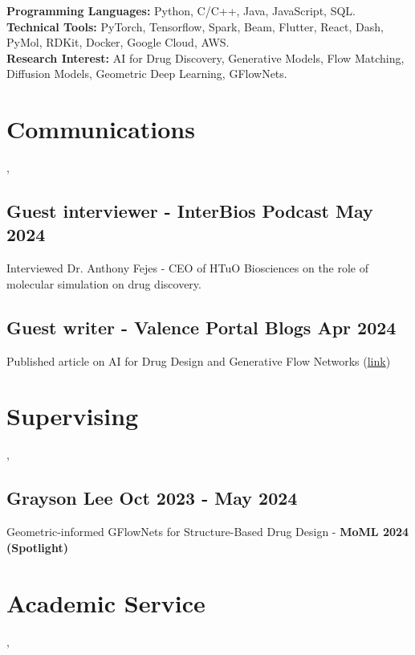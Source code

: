 \documentclass[]{Keval-resume}
\begin{document}
\textbf{Programming Languages:} Python, C/C++, Java, JavaScript, SQL. \\
\postsectionsep
\textbf{Technical Tools:} PyTorch, Tensorflow, Spark, Beam, Flutter, React, Dash, PyMol, RDKit, Docker, Google Cloud, AWS. \\
\postsectionsep
\textbf{Research Interest:} AI for Drug Discovery, Generative Models, Flow Matching, Diffusion Models, Geometric Deep Learning, GFlowNets.


\sectionsep

\section{Communications} 
\sep
\hrulefill
\postsectionsep

\subsection{Guest interviewer - InterBios Podcast \hfill \normalfont May 2024}
Interviewed Dr. Anthony Fejes - CEO of HTuO Biosciences on the role of molecular simulation on drug discovery. 

\sectionsep

\subsection{Guest writer - Valence Portal Blogs \hfill \normalfont Apr 2024}
Published article on AI for Drug Design and Generative Flow Networks (\href{https://portal.valencelabs.com/blogs/post/mle-is-not-all-you-need-for-structure-based-drug-design-N2BmutTw8mMj34K}{link})
\sectionsep

\section{Supervising} 
\sep
\hrulefill
\postsectionsep

\subsection{Grayson Lee \hfill \normalfont Oct 2023 - May 2024}
Geometric-informed GFlowNets for Structure-Based Drug Design - \textbf{MoML 2024 (Spotlight)}
\sectionsep

\section{Academic Service} 
\sep
\hrulefill
\postsectionsep
\end{document}
